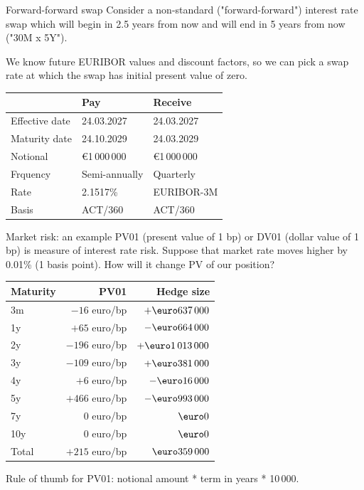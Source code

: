 \documentclass{beamer}
\renewcommand{\EUR}[1]{\textup{\euro}#1}
\begin{document}
\begin{frame}{Forward-forward swap}
\justify
Consider a non-standard ("forward-forward") interest rate swap which will begin in 2.5 years from now and will end in 5 years from now ("30M x 5Y").

\justify
We know future EURIBOR values and discount factors, so we can pick a swap rate at which the swap has initial present value of zero.

\justify
\centering
\begin{tabular}{l|l|l}
& Pay & Receive \\ \hline
Effective date & 24.03.2027 & 24.03.2027 \\ 
Maturity date  & 24.10.2029 & 24.03.2029 \\
Notional       & \EUR{1\,000\,000} & \EUR{1\,000\,000} \\
Frquency       & Semi-annually     & Quarterly \\
Rate           & \alert{2.1517\%}          & EURIBOR-3M   \\
Basis          & ACT/360           & ACT/360
\end{tabular}
\end{frame}



\begin{frame}{Market risk: an example}
\justify
PV01 (present value of 1 bp) or DV01 (dollar value of 1 bp) is measure of interest rate risk. Suppose that market rate moves higher by 0.01\% (1 basis point). How will it change PV of our position?

\justify
\centering
\begin{tabular}{l|r|r}
Maturity  & PV01 & Hedge size \\ \hline
3m & $-16$  euro/bp & $+\EUR{637\,000}$ \\
1y   & $+65$  euro/bp & $-\EUR{664\,000}$ \\
2y    & $-196$ euro/bp & $+\EUR{1\,013\,000}$ \\
3y    & $-109$ euro/bp & $+\EUR{381\,000}$ \\
4y    & $+6$  euro/bp & $-\EUR{16\,000}$ \\
5y    & $+466$ euro/bp & $-\EUR{993\,000}$ \\ 
7y    & $0$ euro/bp & $\EUR{0}$ \\ 
10y    & $0$ euro/bp & $\EUR{0}$ \\ \hline
Total & $+215$ euro/bp & $\EUR{359\,000}$
\end{tabular}

\justify
Rule of thumb for PV01: notional amount * term in years * 10\,000.
\end{frame}
\end{document}
